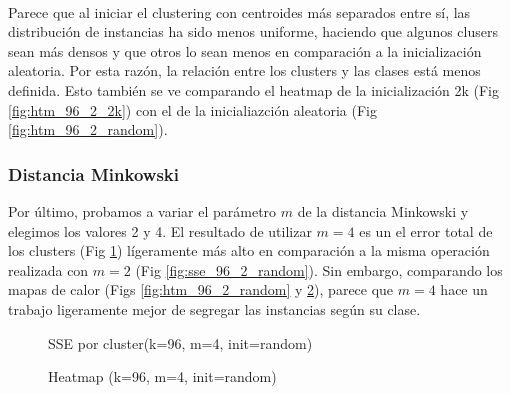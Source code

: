 \documentclass[10pt,a4paper]{article}
\begin{document}
	\paragraph{}
	Parece que al iniciar el clustering con centroides más separados entre sí, las distribución de instancias ha sido menos uniforme, haciendo que algunos clusers sean más densos y que otros lo sean menos en comparación a la inicialización aleatoria. Por esta razón, la relación entre los clusters y las clases está menos definida. Esto también se ve comparando el heatmap de la inicialización 2k (Fig \ref{fig:htm_96_2_2k}) con el de la inicialiazción aleatoria (Fig \ref{fig:htm_96_2_random}).
	
	\subsubsection{Distancia Minkowski}
	Por último, probamos a variar el parámetro $m$ de la distancia Minkowski y elegimos los valores 2 y 4. El resultado de utilizar $m=4$ es un el error total de los clusters (Fig \ref{fig:sse_96_4_random}) lígeramente más alto en comparación a la misma operación realizada con $m=2$ (Fig \ref{fig:sse_96_2_random}). Sin embargo, comparando los mapas de calor (Figs \ref{fig:htm_96_2_random} y \ref{fig:htm_96_4_random}), parece que $m=4$ hace un trabajo ligeramente mejor de segregar las instancias según su clase.
	
	\begin{figure}
		\centering
		\caption{SSE por cluster(k=96, m=4, init=random)}
		\label{fig:sse_96_4_random}
	\end{figure}	
	\begin{figure}
		\centering
		\caption{Heatmap (k=96, m=4, init=random)}
		\label{fig:htm_96_4_random}
	\end{figure}
	
\end{document}
